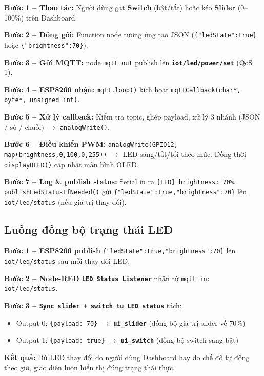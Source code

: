 \documentclass[13pt,a4paper]{article}
\newcommand{\code}[1]{\texttt{#1}}
\begin{document}
\textbf{Bước 1 -- Thao tác:} Người dùng gạt \textbf{Switch} (bật/tắt) hoặc kéo \textbf{Slider} (0--100\%) trên Dashboard.

\textbf{Bước 2 -- Đóng gói:} Function node tương ứng tạo JSON (\code{\{"ledState":true\}} hoặc \code{\{"brightness":70\}}).

\textbf{Bước 3 -- Gửi MQTT:} node \code{mqtt out} publish lên \textbf{\code{iot/led/power/set}} (QoS 1).

\textbf{Bước 4 -- ESP8266 nhận:} \code{mqtt.loop()} kích hoạt \code{mqttCallback(char*, byte*, unsigned int)}.

\textbf{Bước 5 -- Xử lý callback:} Kiểm tra topic, ghép payload, xử lý 3 nhánh (JSON / số / chuỗi) $\rightarrow$ \code{analogWrite()}.

\textbf{Bước 6 -- Điều khiển PWM:} \code{analogWrite(GPIO12, map(brightness,0,100,0,255))} $\rightarrow$ LED sáng/tắt/tối theo mức. Đồng thời \code{displayOLED()} cập nhật màn hình OLED.

\textbf{Bước 7 -- Log \& publish status:} Serial in ra \code{[LED] brightness: 70\%}. \code{publishLedStatusIfNeeded()} gửi \code{\{"ledState":true,"brightness":70\}} lên \code{iot/led/status} (nếu giá trị thay đổi).

\subsection{Luồng đồng bộ trạng thái LED}
\label{sec:luong3}

\textbf{Bước 1 -- ESP8266 publish} \code{\{"ledState":true,"brightness":70\}} lên \code{iot/led/status} sau mỗi thay đổi LED.

\textbf{Bước 2 -- Node-RED \code{LED Status Listener}} nhận từ \code{mqtt in: iot/led/status}.

\textbf{Bước 3 -- \code{Sync slider + switch tu LED status}} tách:
\begin{itemize}
    \item Output 0: \code{\{payload: 70\}} $\rightarrow$ \textbf{\code{ui\_slider}} (đồng bộ giá trị slider về 70\%)
    \item Output 1: \code{\{payload: true\}} $\rightarrow$ \textbf{\code{ui\_switch}} (đồng bộ switch sang bật)
\end{itemize}

\textbf{Kết quả:} Dù LED thay đổi do người dùng Dashboard hay do chế độ tự động theo giờ, giao diện luôn hiển thị đúng trạng thái thực.
\end{document}
